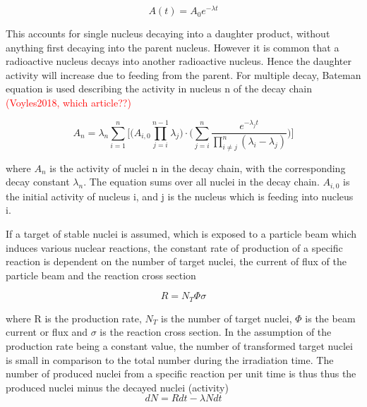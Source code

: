 \documentclass[a4paper,11pt,twoside]{book}
\begin{document}
\begin{equation} \label{eq:activity_decaylaw}
    A(t) = A_0 e^{-\lambda t}
\end{equation}


This accounts for single nucleus decaying into a daughter product, without anything first decaying into the parent nucleus. However it is common that a radioactive nucleus decays into another radioactive nucleus. Hence the daughter activity will increase due to feeding from the parent.
For multiple decay, Bateman equation is used describing the activity in nucleus n of the decay chain \textcolor{red}{(Voyles2018, which article??)}

\begin{equation} \label{eq:ndecay_chains}
    A_n = \lambda_n \sum_{i=1}^n \Big[ \Big( A_{i,0}\prod^{n-1}_{j=i}\lambda_j \Big)\cdot \Big( \sum_{j=i}^n \frac{e^{-\lambda_j t}}{\prod_{i\neq j}^n (\lambda_i - \lambda_j)} \Big) \Big]
\end{equation}

where $A_n$ is the activity of nuclei n in the decay chain, with the corresponding decay constant $\lambda_n$. The equation sums over all nuclei in the decay chain. $A_{i,0}$ is the initial activity of nucleus i, and j is the nucleus which is feeding into nucleus i. 

\noindent 
If a target of stable nuclei is assumed, which is exposed to a particle beam which induces various nuclear reactions, the constant rate of production of a specific reaction is dependent on the number of target nuclei, the current of flux of the particle beam and the reaction cross section

\begin{equation}
    R = N_T \Phi \sigma
\end{equation}

\noindent 
where R is the production rate, $N_T$ is the number of target nuclei, $\Phi$ is the beam current or flux and $\sigma$ is the reaction cross section. In the assumption of the production rate being a constant value, the number of transformed target nuclei is small in comparison to the total number during the irradiation time. The number of produced nuclei from a specific reaction per unit time is thus thus the produced nuclei minus the decayed nuclei (activity)
\begin{equation}
    dN = Rdt - \lambda N dt
\end{equation}
\end{document}
